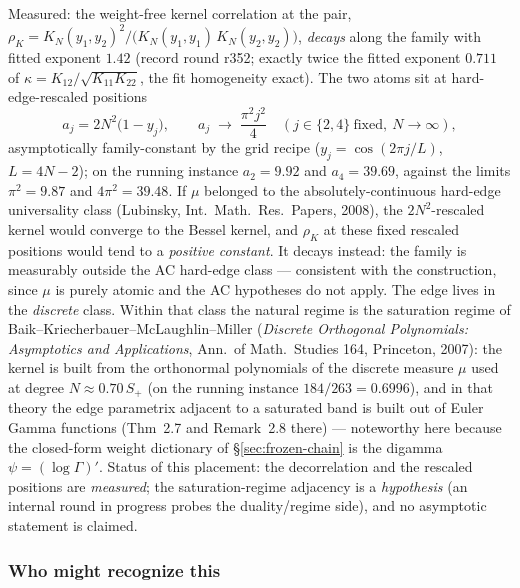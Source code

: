 \documentclass[11pt]{article}
\theoremstyle{remark}
\begin{document}
Measured: the weight-free kernel correlation at the pair,
$\rho_{K}=K_{N}(y_{1},y_{2})^{2}/\bigl(K_{N}(y_{1},y_{1})\,
K_{N}(y_{2},y_{2})\bigr)$, \emph{decays} along the family with
fitted exponent $1.42$ (record round r352; exactly twice the
fitted exponent $0.711$ of
$\kappa=K_{12}/\sqrt{K_{11}K_{22}}$, the fit homogeneity
exact).  The two atoms sit at hard-edge-rescaled positions
\[
a_{j}=2N^{2}\bigl(1-y_{j}\bigr),
\qquad
a_{j}\;\longrightarrow\;\frac{\pi^{2}j^{2}}{4}
\quad(j\in\{2,4\}\ \text{fixed},\ N\to\infty),
\]
asymptotically family-constant by the grid recipe
($y_{j}=\cos(2\pi j/L)$, $L=4N-2$); on the running instance
$a_{2}=9.92$ and $a_{4}=39.69$, against the limits
$\pi^{2}=9.87$ and $4\pi^{2}=39.48$.  If $\mu$ belonged to the
absolutely-continuous hard-edge universality class (Lubinsky,
Int.\ Math.\ Res.\ Papers, 2008), the $2N^{2}$-rescaled kernel
would converge to the Bessel kernel, and $\rho_{K}$ at these
fixed rescaled positions would tend to a \emph{positive
constant}.  It decays instead: the family is measurably outside
the AC hard-edge class --- consistent with the construction,
since $\mu$ is purely atomic and the AC hypotheses do not apply.
The edge lives in the \emph{discrete} class.  Within that class
the natural regime is the saturation regime of
Baik--Kriecherbauer--McLaughlin--Miller (\emph{Discrete
Orthogonal Polynomials: Asymptotics and Applications}, Ann.\ of
Math.\ Studies 164, Princeton, 2007): the kernel is built from
the orthonormal polynomials of the discrete measure $\mu$ used
at degree $N\approx0.70\,S_{+}$ (on the running instance
$184/263=0.6996$), and in that theory the edge parametrix
adjacent to a saturated band is built out of Euler Gamma
functions (Thm~2.7 and Remark~2.8 there) --- noteworthy here
because the closed-form weight dictionary of
\S\ref{sec:frozen-chain} is the digamma $\psi=(\log\Gamma)'$.
Status of this placement: the decorrelation and the rescaled
positions are \emph{measured}; the saturation-regime adjacency
is a \emph{hypothesis} (an internal round in progress probes the
duality/regime side), and no asymptotic statement is claimed.

\subsubsection*{Who might recognize this}
\end{document}
